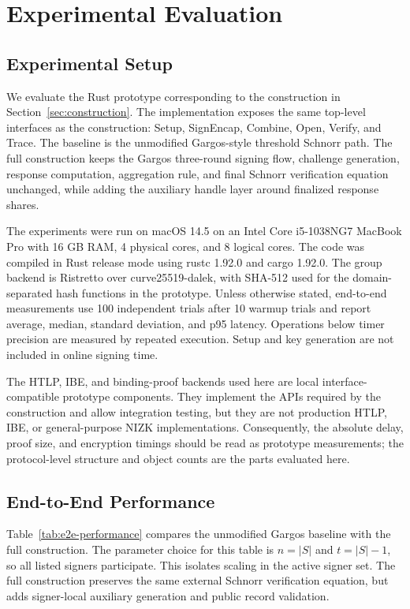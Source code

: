 \section{Experimental Evaluation}
\label{sec:experiment}

\subsection{Experimental Setup}

We evaluate the Rust prototype corresponding to the construction in
Section~\ref{sec:construction}.  The implementation exposes the same top-level
interfaces as the construction: \textsf{Setup}, \textsf{SignEncap},
\textsf{Combine}, \textsf{Open}, \textsf{Verify}, and \textsf{Trace}.  The
baseline is the unmodified Gargos-style threshold Schnorr path.  The full
construction keeps the Gargos three-round signing flow, challenge generation,
response computation, aggregation rule, and final Schnorr verification equation
unchanged, while adding the auxiliary handle layer around finalized response
shares.

The experiments were run on macOS 14.5 on an Intel Core i5-1038NG7 MacBook Pro
with 16 GB RAM, 4 physical cores, and 8 logical cores.  The code was compiled in
Rust release mode using rustc 1.92.0 and cargo 1.92.0.  The group backend is
Ristretto over curve25519-dalek, with SHA-512 used for the domain-separated hash
functions in the prototype.  Unless otherwise stated, end-to-end measurements
use 100 independent trials after 10 warmup trials and report average, median,
standard deviation, and p95 latency.  Operations below timer precision are
measured by repeated execution.  Setup and key generation are not included in
online signing time.

The HTLP, IBE, and binding-proof backends used here are local
interface-compatible prototype components.  They implement the APIs required by
the construction and allow integration testing, but they are not production HTLP,
IBE, or general-purpose NIZK implementations.  Consequently, the absolute delay,
proof size, and encryption timings should be read as prototype measurements; the
protocol-level structure and object counts are the parts evaluated here.

\subsection{End-to-End Performance}

Table~\ref{tab:e2e-performance} compares the unmodified Gargos baseline with the
full construction.  The parameter choice for this table is $n=|S|$ and
$t=|S|-1$, so all listed signers participate.  This isolates scaling in the
active signer set.  The full construction preserves the same external Schnorr
verification equation, but adds signer-local auxiliary generation and public
record validation.


